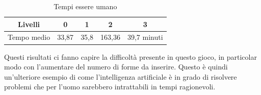 \begin{table}[h]
	\centering
	\begin{tabular}{lllll}
		\hline
		\multicolumn{1}{|c|}{Livelli}     & \multicolumn{1}{c|}{0}     & \multicolumn{1}{c|}{1}    & \multicolumn{1}{c|}{2}      & \multicolumn{1}{c|}{3}           \\ \hline
		\multicolumn{1}{|c|}{Tempo medio} & \multicolumn{1}{c|}{33,87} & \multicolumn{1}{c|}{35,8} & \multicolumn{1}{c|}{163,36} & \multicolumn{1}{c|}{39,7 minuti} \\ \hline                               
	\end{tabular}
	\caption{Tempi essere umano}
\end{table}
Questi risultati ci fanno capire la difficoltà presente in questo gioco, in particolar modo con l'aumentare del numero di forme da inserire. Questo è quindi un'ulteriore esempio di come l'intelligenza artificiale è in grado di risolvere problemi che per l'uomo sarebbero intrattabili in tempi ragionevoli. 
